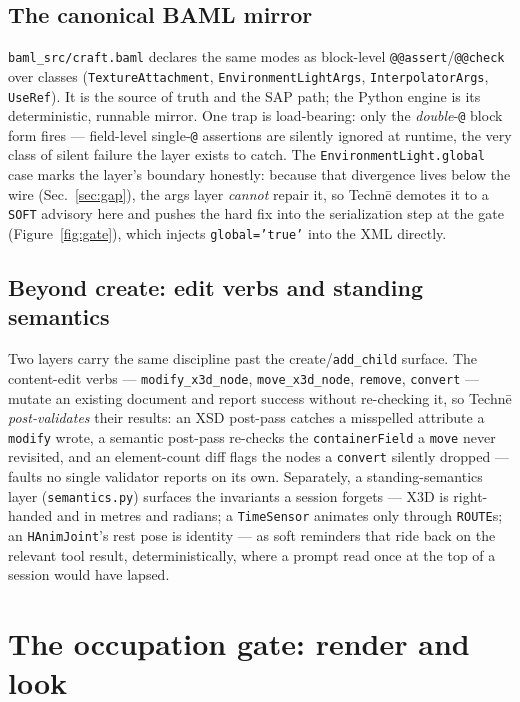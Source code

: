 \documentclass[sigconf,nonacm,screen,anonymous]{acmart}
\begin{document}
\subsection{The canonical BAML mirror}
\texttt{baml\_src/craft.baml} declares the same modes as block-level \texttt{@@assert}/\texttt{@@check} over classes (\texttt{TextureAttachment}, \texttt{EnvironmentLightArgs}, \texttt{InterpolatorArgs}, \texttt{UseRef}). It is the source of truth and the SAP path; the Python engine is its deterministic, runnable mirror. One trap is load-bearing: only the \emph{double}-\texttt{@} block form fires --- field-level single-\texttt{@} assertions are silently ignored at runtime, the very class of silent failure the layer exists to catch. The \texttt{EnvironmentLight.global} case marks the layer's boundary honestly: because that divergence lives below the wire (Sec.~\ref{sec:gap}), the args layer \emph{cannot} repair it, so Technē demotes it to a \texttt{SOFT} advisory here and pushes the hard fix into the serialization step at the gate (Figure~\ref{fig:gate}), which injects \texttt{global='true'} into the XML directly.

\subsection{Beyond create: edit verbs and standing semantics}
Two layers carry the same discipline past the create/\texttt{add\_child} surface. The content-edit verbs --- \texttt{modify\_x3d\_node}, \texttt{move\_x3d\_node}, \texttt{remove}, \texttt{convert} --- mutate an existing document and report success without re-checking it, so Technē \emph{post-validates} their results: an XSD post-pass catches a misspelled attribute a \texttt{modify} wrote, a semantic post-pass re-checks the \texttt{containerField} a \texttt{move} never revisited, and an element-count diff flags the nodes a \texttt{convert} silently dropped --- faults no single validator reports on its own. Separately, a standing-semantics layer (\texttt{semantics.py}) surfaces the invariants a session forgets --- X3D is right-handed and in metres and radians; a \texttt{TimeSensor} animates only through \texttt{ROUTE}s; an \texttt{HAnimJoint}'s rest pose is identity --- as soft reminders that ride back on the relevant tool result, deterministically, where a prompt read once at the top of a session would have lapsed.

\section{The occupation gate: render and look}\label{sec:point3}
\end{document}
